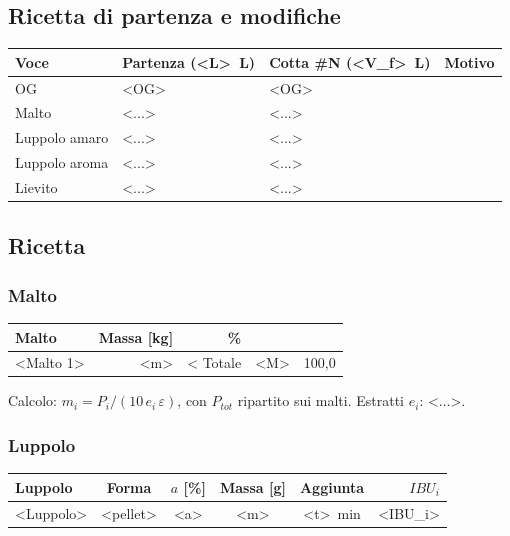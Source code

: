 \subsection*{Ricetta di partenza e modifiche}
\begin{tabularx}{\linewidth}{@{}lXXX@{}}
\toprule
Voce & Partenza (\SI{<L>}{\liter}) & Cotta \#N (\SI{<V_f>}{\liter}) & Motivo \\
\midrule
OG & <OG> & <OG> & \\
Malto & <...> & <...> & \\
Luppolo amaro & <...> & <...> & \\
Luppolo aroma & <...> & <...> & \\
Lievito & <...> & <...> & \\
\bottomrule
\end{tabularx}

\subsection*{Ricetta}

\subsubsection*{Malto}
\begin{tabularx}{\linewidth}{@{}Xrr@{}}
\toprule
Malto & Massa [\si{\kilo\gram}] & \% \\
\midrule
<Malto 1> & <m> & <%
\midrule
Totale & <M> & 100,0 \\
\bottomrule
\end{tabularx}

\noindent Calcolo: $m_i = P_i / (10\, e_i\, \varepsilon)$, con $P_{tot}$ ripartito sui malti. Estratti $e_i$: <...>.

\subsubsection*{Luppolo}
\begin{tabularx}{\linewidth}{@{}Xccccr@{}}
\toprule
Luppolo & Forma & $a$ [\si{\percent}] & Massa [\si{\gram}] & Aggiunta & $IBU_i$ \\
\midrule
<Luppolo> & <pellet> & <a> & <m> & \SI{<t>}{\minute} & <IBU_i> \\
\bottomrule
\end{tabularx}

